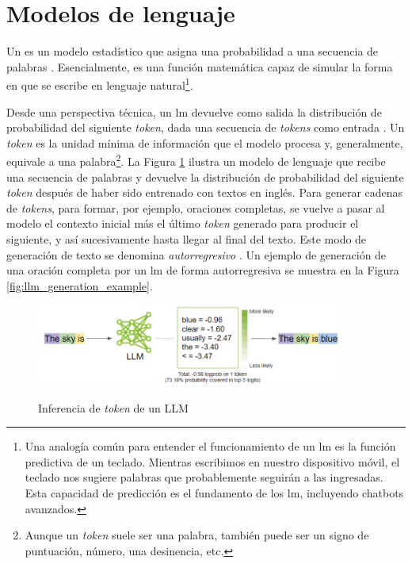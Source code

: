 \section{Modelos de lenguaje}

Un  es un modelo estadístico que asigna una probabilidad a una secuencia de palabras \cite{ModelacionLenguaje2024}. Esencialmente, es una función matemática capaz de simular la forma en que se escribe en lenguaje natural\footnote{Una analogía común para entender el funcionamiento de un \gls{lm} es la función predictiva de un teclado. Mientras escribimos en nuestro dispositivo móvil, el teclado nos sugiere palabras que probablemente seguirán a las ingresadas. Esta capacidad de predicción es el fundamento de los \gls{lm}, incluyendo chatbots avanzados.}.

Desde una perspectiva técnica, un \gls{lm} devuelve como salida la distribución de probabilidad del siguiente \textit{token}, dada una secuencia de \textit{tokens} como entrada \citep{GenerationLLMs}. Un \textit{token} es la unidad mínima de información que el modelo procesa y, generalmente, equivale a una palabra\footnote{Aunque un \textit{token} suele ser una palabra, también puede ser un signo de puntuación, número, una desinencia, etc.}.  La Figura \ref{fig:llm_generation} ilustra un modelo de lenguaje que recibe una secuencia de palabras y devuelve la distribución de probabilidad del siguiente \textit{token} después de haber sido entrenado con textos en inglés. Para generar cadenas de \textit{tokens}, para formar, por ejemplo, oraciones completas, se vuelve a pasar al modelo el contexto inicial más el último \textit{token} generado para producir el siguiente, y así sucesivamente hasta llegar al final del texto. Este modo de generación de texto se denomina \textit{autorregresivo} \citep{malachAutoRegressiveNextTokenPredictors2023}. Un ejemplo de generación de una oración completa por un \gls{lm} de forma autorregresiva se muestra en la Figura \ref{fig:llm_generation_example}.

\begin{figure}[H]
    \caption[Inferencia de \textit{token} de un LLM]{Inferencia de \textit{token} de un LLM}
    \centering
    \includegraphics[width=0.9\textwidth]{./figuras/LLM_predice_token.png}
    \label{fig:llm_generation}
\end{figure}

